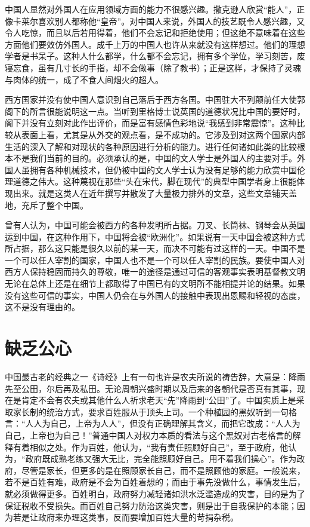 \documentclass[12pt,oneside]{book}
\begin{document}
\begin{common-format}
中国人显然对外国人在应用领域方面的能力不很感兴趣。撒克逊人欣赏“能人”，正像卡莱尔喜欢别人都称他“皇帝”。对中国人来说，外国人的技艺既令人感兴趣，又令人吃惊，而且以后若用得着，他们不会忘记和拒绝使用；但这绝不意味着在这些方面他们要效仿外国人。成千上万的中国人也许从来就没有这样想过。他们的理想学者是书呆子。这种人什么都学，什么都不会忘记，拥有多个学位，学习刻苦，废寝忘食，虽有几寸长的手指，却不会做事（除了教书）；正是这样，才保持了灵魂与肉体的统一，成了不食人间烟火的超人。 

西方国家并没有使中国人意识到自己落后于西方各国。中国驻大不列颠前任大使郭阁下的所言很能说明这一点。当听到里格博士说英国的道德状况比中国的要好时，阁下并没有立刻对此作出评价，而是富有感情色彩地说“我感到非常震惊”。这种比较从表面上看，尤其是从外交的观点看，是不成功的。它涉及到对这两个国家内部生活的深入了解和对现状的各种原因进行分析的能力。进行任何诸如此类的比较根本不是我们当前的目的。必须承认的是，中国的文人学士是外国人的主要对手。外国人虽拥有各种机械技术，但仍被中国的文人学士认为没有足够的能力欣赏中国伦理道德之伟大。这种蔑视在那些“头在宋代，脚在现代”的典型中国学者身上很能体现出来。就是这类人在近年撰写并散发了大量极力排外的文章，这些文章铺天盖地，充斥了整个中国。 

曾有人认为，中国可能会被西方的各种发明所占据。刀叉、长筒袜、钢琴会从英国运到中国，在这种作用下，中国将会被“欧洲化”。如果说有一天中国会被这种方式所占据，那么这只能是很久以前的某一天，而决不可能有过这样的一天。中国不是一个可以任人宰割的国家，中国人也不是一个可以任人宰割的民族。要使中国人对西方人保持稳固而持久的尊敬，唯一的途径是通过可信的客观事实表明基督教文明无论在总体上还是在细节上都取得了中国已有的文明所不能相提并论的结果。如果没有这些可信的事实，中国人仍会在与外国人的接触中表现出恩赐和轻视的态度，这不是没有理由的。

\chapter{缺乏公心}
中国最古老的经典之一《诗经》上有一句也许是农夫所说的祷告辞，大意是：降雨先至公田，尔后再及私田。无论周朝兴盛时期以及后来的各朝代是否真有其事，现在是肯定不会有农夫或其他什么人祈求老天“先”降雨到“公田”了。中国实质上是采取家长制的统治方式，要求百姓服从于顶头上司。一个种植园的黑奴听到一句格言：“人人为自己，上帝为人人”，但没有正确理解其含义，而把它改成：“人人为自己，上帝也为自己！”普通中国人对权力本质的看法与这个黑奴对古老格言的解释有着相似之处。作为百姓，他认为，“我有责任照顾好自己”，至于政府，他认为，“政府既成熟老练又强大无比，完全能照顾好自己。用不着我们操心”。作为政府，尽管是家长，但更多的是在照顾家长自己，而不是照顾他的家庭。一般说来，若不是百姓有难，政府是不会为百姓着想的；而由于事先没做什么，事情发生后，就必须做得更多。百姓明白，政府努力减轻诸如洪水泛滥造成的灾害，目的是为了保证税收不受损失。而百姓自己努力防治这类灾害，则是出于自我保护的本能；因为若是让政府来办理这类事，反而要增加百姓大量的苛捐杂税。 


\end{common-format}
\end{document}
